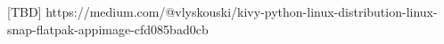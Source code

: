 
[TBD] https://medium.com/@vlyskouski/kivy-python-linux-distribution-linux-snap-flatpak-appimage-cfd085bad0cb
